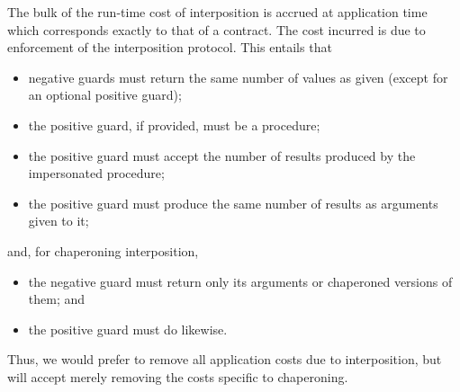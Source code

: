 \documentclass{sigplanconf}
\begin{document}
The bulk of the run-time cost of interposition is accrued at application time which corresponds exactly to that of a contract.
The cost incurred is due to enforcement of the interposition protocol.
This entails that
\begin{itemize}
\item negative guards must return the same number of values as given (except for an optional positive guard);
\item the positive guard, if provided, must be a procedure;
\item the positive guard must accept the number of results produced by the impersonated procedure;
\item the positive guard must produce the same number of results as arguments given to it;
\end{itemize}
and, for chaperoning interposition,
\begin{itemize}
\item the negative guard must return only its arguments or chaperoned versions of them; and
\item the positive guard must do likewise.
\end{itemize}

Thus, we would prefer to remove all application costs due to interposition, but will accept merely removing the costs specific to chaperoning.



\end{document}
